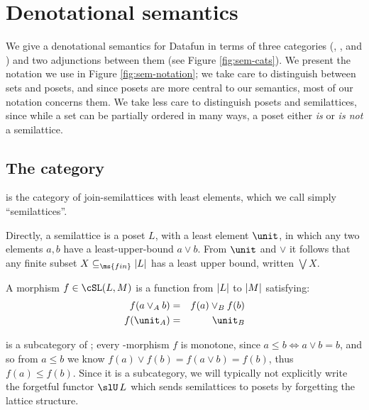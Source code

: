 
\section{Denotational semantics}
\label{sec:semantics}



We give a denotational semantics for Datafun in terms of three categories
(\cSet{}, \cPoset{}, and \cSL{}) and two adjunctions between them (see Figure
\ref{fig:sem-cats}). We present the notation we use in Figure
\ref{fig:sem-notation}; we take care to distinguish between sets and posets, and
since posets are more central to our semantics, most of our notation concerns
them. We take less care to distinguish posets and semilattices, since while a
set can be partially ordered in many ways, a poset either \emph{is} or \emph{is
  not} a semilattice.

\subsection{The category \cSL{}}

\cSL{} is the category of join-semilattices with least elements, which we call
simply ``semilattices''.

Directly, a semilattice is a poset $L$, with a least element $\unit$, in which
any two elements $a,b$ have a least-upper-bound $a \vee b$. From $\unit$ and
$\vee$ it follows that any finite subset $X \subseteq_{\ms{fin}} \U{L}$ has a
least upper bound, written $\bigvee X$.

A morphism $f \in \cSL(L, M)$ is a function from $|L|$ to $|M|$ satisfying:
\begin{eqnarray*}
  f(a \vee_A b) &=& f(a) \vee_B f(b)\\
  f(\unit_A) &=& \unit_B
\end{eqnarray*}

\cSL{} is a subcategory of ; every \cSL{}-morphism $f$ is monotone,
since $a \le b \iff a \vee b = b$, and so from $a \le b$ we know $f(a) \vee f(b)
= f(a \vee b) = f(b)$, thus $f(a) \le f(b)$. Since it is a subcategory, we will
typically not explicitly write the forgetful functor $\slU\,L$ which sends
semilattices to posets by forgetting the lattice structure.

